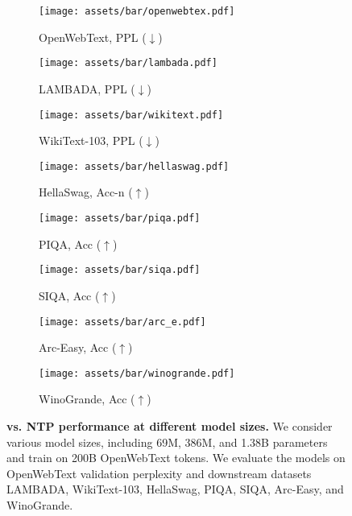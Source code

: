 \begin{figure*}[t!]
\centering\small

\begin{subfigure}{0.245\textwidth}
    \texttt{[image: assets/bar/openwebtex.pdf]}
    \caption{OpenWebText, PPL ($\downarrow$)}
\end{subfigure}
\begin{subfigure}{0.245\textwidth}
    \texttt{[image: assets/bar/lambada.pdf]}
    \caption{LAMBADA, PPL ($\downarrow$)}
\end{subfigure}
\begin{subfigure}{0.245\textwidth}
    \texttt{[image: assets/bar/wikitext.pdf]}
    \caption{WikiText-103, PPL ($\downarrow$)}
\end{subfigure}
\begin{subfigure}{0.245\textwidth}
    \texttt{[image: assets/bar/hellaswag.pdf]}
    \caption{HellaSwag, Acc-n ($\uparrow$)}
\end{subfigure}
\begin{subfigure}{0.245\textwidth}
    \texttt{[image: assets/bar/piqa.pdf]}
    \caption{PIQA, Acc ($\uparrow$)}
\end{subfigure}
\begin{subfigure}{0.245\textwidth}
    \texttt{[image: assets/bar/siqa.pdf]}
    \caption{SIQA, Acc ($\uparrow$)}
\end{subfigure}
\begin{subfigure}{0.245\textwidth}
    \texttt{[image: assets/bar/arc\_e.pdf]}
    \caption{Arc-Easy, Acc ($\uparrow$)}
\end{subfigure}
\begin{subfigure}{0.245\textwidth}
    \texttt{[image: assets/bar/winogrande.pdf]}
    \caption{WinoGrande, Acc ($\uparrow$)}
\end{subfigure}
\caption{
\textbf{\sname vs. NTP performance at different model sizes.} We consider various model sizes, including 69M, 386M, and 1.38B parameters and train on 200B OpenWebText tokens. We evaluate the models on OpenWebText validation perplexity and downstream datasets LAMBADA, WikiText-103, HellaSwag, PIQA, SIQA, Arc-Easy, and WinoGrande.
}
\label{fig:downstream}
\end{figure*}
